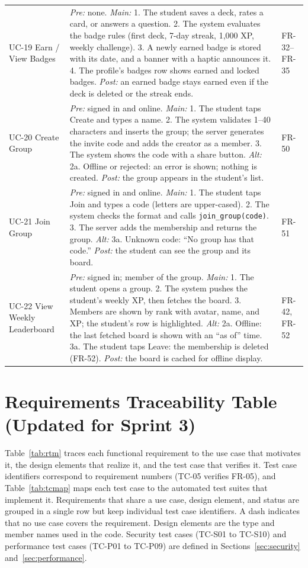 \documentclass[12pt,letterpaper]{article}
\begin{document}
\begin{xltabular}{\textwidth}{@{}L{2.3cm} Y L{2.1cm}@{}}
UC-19 Earn / View Badges & \emph{Pre:} none. \emph{Main:} 1. The student saves a deck, rates a card, or answers a question. 2. The system evaluates the badge rules (first deck, 7-day streak, 1,000 XP, weekly challenge). 3. A newly earned badge is stored with its date, and a banner with a haptic announces it. 4. The profile's badges row shows earned and locked badges. \emph{Post:} an earned badge stays earned even if the deck is deleted or the streak ends. & FR-32--FR-35 \\
UC-20 Create Group & \emph{Pre:} signed in and online. \emph{Main:} 1. The student taps Create and types a name. 2. The system validates 1--40 characters and inserts the group; the server generates the invite code and adds the creator as a member. 3. The system shows the code with a share button. \emph{Alt:} 2a. Offline or rejected: an error is shown; nothing is created. \emph{Post:} the group appears in the student's list. & FR-50 \\
UC-21 Join Group & \emph{Pre:} signed in and online. \emph{Main:} 1. The student taps Join and types a code (letters are upper-cased). 2. The system checks the format and calls \texttt{join\_group(code)}. 3. The server adds the membership and returns the group. \emph{Alt:} 3a. Unknown code: ``No group has that code.'' \emph{Post:} the student can see the group and its board. & FR-51 \\
UC-22 View Weekly Leaderboard & \emph{Pre:} signed in; member of the group. \emph{Main:} 1. The student opens a group. 2. The system pushes the student's weekly XP, then fetches the board. 3. Members are shown by rank with avatar, name, and XP; the student's row is highlighted. \emph{Alt:} 2a. Offline: the last fetched board is shown with an ``as of'' time. 3a. The student taps Leave: the membership is deleted (FR-52). \emph{Post:} the board is cached for offline display. & FR-42, FR-52 \\
\end{xltabular}

\section{Requirements Traceability Table (Updated for Sprint 3)}\label{sec:trace}

Table~\ref{tab:rtm} traces each functional requirement to the use case that motivates
it, the design elements that realize it, and the test case that verifies it. Test case
identifiers correspond to requirement numbers (TC-05 verifies FR-05), and
Table~\ref{tab:tcmap} maps each test case to the automated test suites that implement
it. Requirements that share a use case, design element, and status are grouped in a
single row but keep individual test case identifiers. A dash indicates that no use case
covers the requirement. Design elements are the type and member names used in the code.
Security test cases (TC-S01 to TC-S10) and performance test cases (TC-P01 to TC-P09)
are defined in Sections~\ref{sec:security} and~\ref{sec:performance}.
\end{document}
